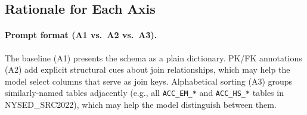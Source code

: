 \documentclass[11pt,letterpaper]{article}
\begin{document}
\begin{table}[ht]
\centering
\caption{%
  Ablation configurations. Each row changes one variable (bold) relative to
  baseline A1. \emph{all} modules: \{q,k,v,o,gate,up,down\}\_proj;
  \emph{attn}: \{q,k,v,o\}\_proj.
}
\label{tab:configs}
\end{table}

\subsection{Rationale for Each Axis}

\paragraph{Prompt format (A1 vs.\ A2 vs.\ A3).}
The baseline (A1) presents the schema as a plain dictionary.
PK/FK annotations (A2) add explicit structural cues about join relationships,
which may help the model select columns that serve as join keys.
Alphabetical sorting (A3) groups similarly-named tables adjacently (e.g., all
\texttt{ACC\_EM\_*} and \texttt{ACC\_HS\_*} tables in NYSED\_SRC2022), which
may help the model distinguish between them.
\end{document}
